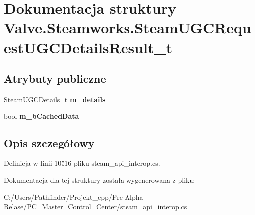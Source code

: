 \hypertarget{struct_valve_1_1_steamworks_1_1_steam_u_g_c_request_u_g_c_details_result__t}{}\section{Dokumentacja struktury Valve.\+Steamworks.\+Steam\+U\+G\+C\+Request\+U\+G\+C\+Details\+Result\+\_\+t}
\label{struct_valve_1_1_steamworks_1_1_steam_u_g_c_request_u_g_c_details_result__t}
\subsection*{Atrybuty publiczne}
\begin{DoxyCompactItemize}
\item 
\mbox{\label{struct_valve_1_1_steamworks_1_1_steam_u_g_c_request_u_g_c_details_result__t_a60a06f0c9f64c8292a369eb0ddaf27db}} 
\hyperlink{struct_valve_1_1_steamworks_1_1_steam_u_g_c_details__t}{Steam\+U\+G\+C\+Details\+\_\+t} {\bfseries m\+\_\+details}
\item 
\mbox{\label{struct_valve_1_1_steamworks_1_1_steam_u_g_c_request_u_g_c_details_result__t_aa3018885358b707adb4075f575ea5c4f}} 
bool {\bfseries m\+\_\+b\+Cached\+Data}
\end{DoxyCompactItemize}


\subsection{Opis szczegółowy}


Definicja w linii 10516 pliku steam\+\_\+api\+\_\+interop.\+cs.



Dokumentacja dla tej struktury została wygenerowana z pliku\+:\begin{DoxyCompactItemize}
\item 
C\+:/\+Users/\+Pathfinder/\+Projekt\+\_\+cpp/\+Pre-\/\+Alpha Relase/\+P\+C\+\_\+\+Master\+\_\+\+Control\+\_\+\+Center/steam\+\_\+api\+\_\+interop.\+cs\end{DoxyCompactItemize}
